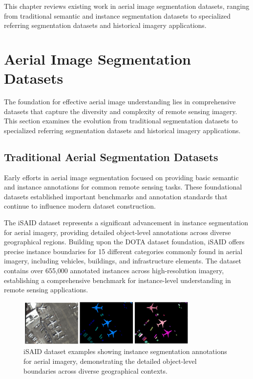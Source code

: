 \cleardoublepage
\label{chap:architecture}

This chapter reviews existing work in aerial image segmentation datasets, ranging from traditional semantic and instance segmentation datasets to specialized referring segmentation datasets and historical imagery applications.

\section{Aerial Image Segmentation Datasets}

The foundation for effective aerial image understanding lies in comprehensive datasets that capture the diversity and complexity of remote sensing imagery. This section examines the evolution from traditional segmentation datasets to specialized referring segmentation datasets and historical imagery applications.

\subsection{Traditional Aerial Segmentation Datasets}

Early efforts in aerial image segmentation focused on providing basic semantic and instance annotations for common remote sensing tasks. These foundational datasets established important benchmarks and annotation standards that continue to influence modern dataset construction.

The iSAID dataset represents a significant advancement in instance segmentation for aerial imagery, providing detailed object-level annotations across diverse geographical regions. Building upon the DOTA dataset foundation, iSAID offers precise instance boundaries for 15 different categories commonly found in aerial imagery, including vehicles, buildings, and infrastructure elements. The dataset contains over 655,000 annotated instances across high-resolution imagery, establishing a comprehensive benchmark for instance-level understanding in remote sensing applications.

\begin{figure}[htbp]
\centering
\includegraphics[width=0.8\textwidth]{Images/isaid_examples.png}
\caption{iSAID dataset examples showing instance segmentation annotations for aerial imagery, demonstrating the detailed object-level boundaries across diverse geographical contexts.}
\label{fig:isaid_examples}
\end{figure}

